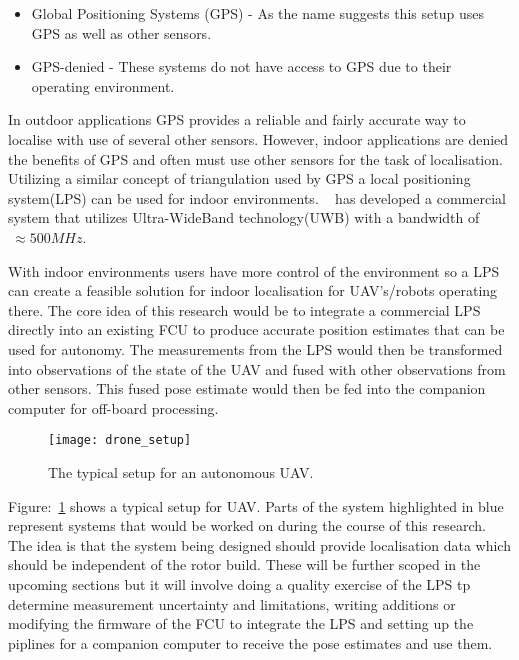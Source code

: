     \begin{itemize}
        \item Global Positioning Systems (GPS) - As the name suggests this setup uses GPS as well as other sensors.
        \item GPS-denied - These systems do not have access to GPS due to their operating environment.
    \end{itemize}
    In outdoor applications GPS provides a reliable and fairly accurate way to localise with use of several other sensors.
    However, indoor applications are denied the benefits of GPS and often must use other sensors for the task of localisation.
    Utilizing a similar concept of triangulation used by GPS a local positioning system(LPS) can be used for indoor environments.
    ~\citep{pozyx2018pozyx} has developed a commercial system that utilizes Ultra-WideBand technology(UWB) with a bandwidth of $~\approx 500MHz$.

    With indoor environments users have more control of the environment so a LPS can create a feasible solution for indoor localisation for UAV's/robots operating there.
    The core idea of this research would be to integrate a commercial LPS directly into an existing FCU to produce accurate position estimates that can be used for autonomy.
    The measurements from the LPS would then be transformed into observations of the state of the UAV and fused with other observations from other sensors.
    This fused pose estimate would then be fed into the companion computer for off-board processing.
    \begin{figure}[h!]
        \centering
        \texttt{[image: drone\_setup]}
        \caption{The typical setup for an autonomous UAV.}
        \label{fig:ds}
    \end{figure}

    Figure:~\ref{fig:ds} shows a typical setup for UAV.
    Parts of the system highlighted in blue represent systems that would be worked on during the course of this research.
    The idea is that the system being designed should provide localisation data which should be independent of the rotor build.
    These will be further scoped in the upcoming sections but it will involve doing a quality exercise of the LPS tp determine measurement uncertainty and limitations,
    writing additions or modifying the firmware of the FCU to integrate the LPS and setting up the piplines for a companion computer to receive the pose estimates and use them.



